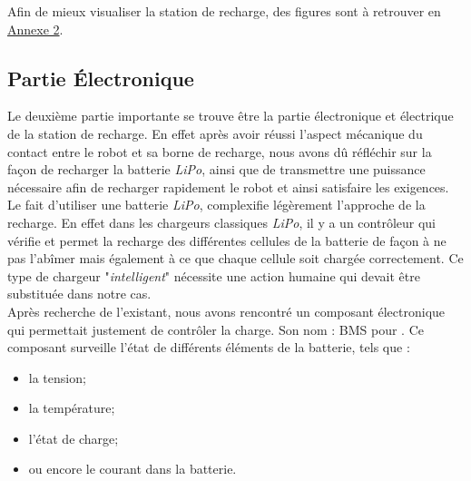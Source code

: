 \documentclass[french]{rapportENSTAB}
\begin{document}
Afin de mieux visualiser la station de recharge, des figures sont à retrouver en \hyperlink{annexe}{Annexe 2}.\\

\subsection{Partie Électronique}
Le deuxième partie importante se trouve être la partie électronique et électrique de la station de recharge. En effet après avoir réussi l'aspect mécanique du contact entre le robot et sa borne de recharge, nous avons dû réfléchir sur la façon de recharger la batterie \textit{LiPo}, ainsi que de transmettre une puissance nécessaire afin de recharger rapidement le robot et ainsi satisfaire les exigences. \\

Le fait d'utiliser une batterie \textit{LiPo}, complexifie légèrement l'approche de la recharge. En effet dans les chargeurs classiques \textit{LiPo}, il y a un contrôleur qui vérifie et permet la recharge des différentes cellules de la batterie de façon à ne pas l'abîmer mais également à ce que chaque cellule soit chargée correctement. Ce type de chargeur "\textit{intelligent}" nécessite une action humaine qui devait être substituée dans notre cas.\\
Après recherche de l'existant, nous avons rencontré un composant électronique qui permettait justement de contrôler la charge. Son nom : BMS pour . Ce composant surveille l'état de différents éléments de la batterie, tels que : \begin{itemize}[label=\textbullet, font=\small\color{blue}]
    \item la tension;
    \item la température;
    \item l'état de charge;
    \item ou encore le courant dans la batterie.
\end{itemize}
\\
\end{document}

